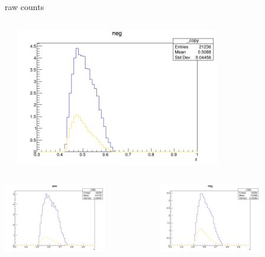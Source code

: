 \begin{frame}{raw counts}
\begin{columns}
\begin{column}[T]{0.25\textwidth}
\end{column}
\begin{column}[T]{0.25\textwidth}
\includegraphics[width = 0.7\textwidth]{results/yield/statistics/yield_x_Q2_z_0.50_5.500_0.50_neg.png}
\end{column}
\end{columns}
\begin{columns}
\begin{column}[T]{0.25\textwidth}
\includegraphics[width = 0.7\textwidth]{results/yield/statistics/yield_x_Q2_z_0.50_5.500_0.60_pos.png}
\end{column}
\begin{column}[T]{0.25\textwidth}
\includegraphics[width = 0.7\textwidth]{results/yield/statistics/yield_x_Q2_z_0.50_5.500_0.60_neg.png}

\end{column}
\end{columns}
\end{frame}
